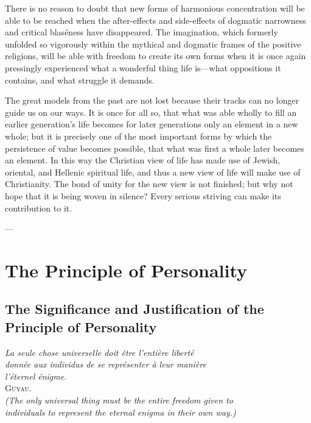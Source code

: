 \documentclass[12pt,a4paper]{book}
\newcommand{\opage}[1]{\marginnote{\footnotesize\textit{[#1]}}}
\begin{document}
There is no reason to doubt that new forms of harmonious concentration will be able to be reached when the
after-effects and side-effects of dogmatic narrowness and critical blaséness have disappeared. The imagination,
which formerly unfolded so vigorously within the mythical and dogmatic frames of the positive religions, will
be able with freedom to create its own forms when it is once again pressingly experienced what a wonderful
thing life is---what oppositions it contains, and what struggle it demands.

The great models from the past are not lost because their tracks can no longer guide us on our ways. It is once
for all so, that what was able wholly to fill an earlier generation's life becomes for later generations only an
element in a new whole; but it is precisely one of the most important forms by which the persistence of value
becomes possible, that what was first a whole later 
\opage{189}becomes an element. In this way the Christian view of life
has made use of Jewish, oriental, and Hellenic spiritual life, and thus a new view of life will make use of
Christianity. The bond of unity for the new view is not finished; but why not hope that it is being woven in
silence? Every serious striving can make its contribution to it.

\begin{center}---\end{center}

\section{The Principle of Personality}
\label{sec:personality}

\subsection{The Significance and Justification of the
  Principle of Personality}
\label{ssec:pers-significance}

\begin{flushright}
\opage{190}
\textit{La seule chose universelle doit être l'entière liberté}\\
\textit{donnée aux individus de se représenter à leur manière}\\
\textit{l'éternel énigme.}\\[2pt]
\textsc{Guyau}.\\[4pt]
\textit{(The only universal thing must be the entire freedom given to}\\
\textit{individuals to represent the eternal enigma in their own way.)}
\end{flushright}
\end{document}
